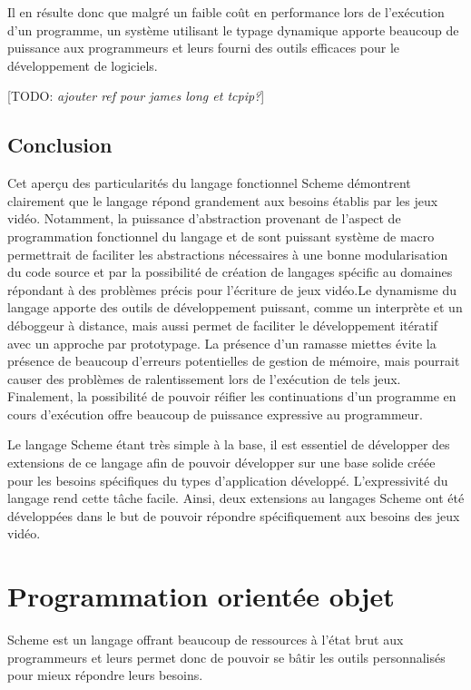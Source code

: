 \documentclass[12pt,oneside,letterpaper,francais]{book}
\newcommand{\todo}[1]{[TODO: {\it #1}]}
\begin{document}
Il en résulte donc que malgré un faible coût en performance lors de
l'exécution d'un programme, un système utilisant le typage dynamique
apporte beaucoup de puissance aux programmeurs et leurs fourni des
outils efficaces pour le développement de logiciels.

\todo{ajouter ref pour james long et tcpip?}


\section{Conclusion}

Cet aperçu des particularités du langage fonctionnel Scheme démontrent
clairement que le langage répond grandement aux besoins établis par
les jeux vidéo. Notamment, la puissance d'abstraction provenant de
l'aspect de programmation fonctionnel du langage et de sont puissant
système de macro permettrait de faciliter les abstractions nécessaires
à une bonne modularisation du code source et par la possibilité de
création de langages spécific au domaines répondant à des problèmes
précis pour l'écriture de jeux vidéo.Le dynamisme du langage apporte
des outils de développement puissant, comme un interprète et un
déboggeur à distance, mais aussi permet de faciliter le développement
itératif avec un approche par prototypage. La présence d'un ramasse
miettes évite la présence de beaucoup d'erreurs potentielles de
gestion de mémoire, mais pourrait causer des problèmes de
ralentissement lors de l'exécution de tels jeux. Finalement, la
possibilité de pouvoir réifier les continuations d'un programme en
cours d'exécution offre beaucoup de puissance expressive au
programmeur.

Le langage Scheme étant très simple à la base, il est essentiel de
développer des extensions de ce langage afin de pouvoir développer sur
une base solide créée pour les besoins spécifiques du types
d'application développé. L'expressivité du langage rend cette tâche
facile. Ainsi, deux extensions au langages Scheme ont été développées
dans le but de pouvoir répondre spécifiquement aux besoins des jeux
vidéo.


\chapter{Programmation orientée objet}
\label{Chapter:OO}


Scheme est un langage offrant beaucoup de ressources à l'état brut aux
programmeurs et leurs permet donc de pouvoir se bâtir les outils
personnalisés pour mieux répondre leurs besoins. 
\end{document}
